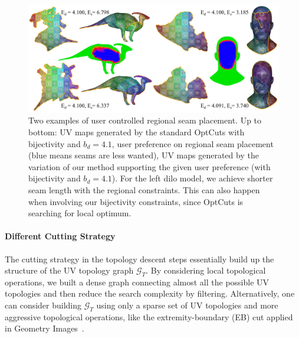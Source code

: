 \begin{figure}[!h]
\centering
\includegraphics[width=\linewidth]{fig/regional_user.png}
\caption{Two examples of user controlled regional seam placement. Up to bottom: UV maps generated by the standard OptCuts with bijectivity and $b_d = 4.1$, user preference on regional seam placement (blue means seams are less wanted), UV maps generated by the variation of our method supporting the given user preference (with bijectivity and $b_d = 4.1$). For the left dilo model, we achieve shorter seam length with the regional constraints. This can also happen when involving our bijectivity constraints, since OptCuts is searching for local optimum.}
\label{fig:regional_seam_placement}
\end{figure}


\paragraph{Different Cutting Strategy}
The cutting strategy in the topology descent steps essentially build up the structure of the UV topology graph $\mathcal{G}_T$. By considering local topological operations, we built a dense graph connecting almost all the possible UV topologies and then reduce the search complexity by filtering. Alternatively, one can consider building $\mathcal{G}_T$ using only a sparse set of UV topologies and more aggressive topological operations, like the extremity-boundary (EB) cut applied in Geometry Images~\cite{Gu2002Geometry}.

